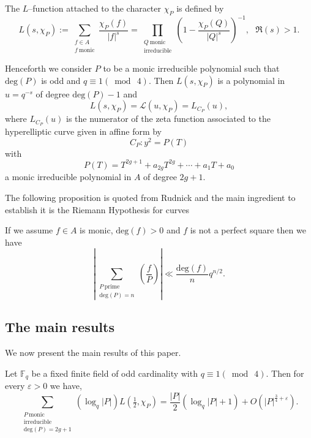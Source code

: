 \documentclass[11pt]{amsart}
\begin{document}
The $L$--function attached to the character $\chi_{P}$ is defined by
\begin{equation}
L(s,\chi_{P}):=\sum_{\substack{f\in A \\ f \ \mathrm{monic}}}\frac{\chi_{P}(f)}{|f|^{s}}=\prod_{\substack{Q \ \mathrm{monic} \\ \mathrm{irreducible}}}\left(1-\frac{\chi_{P}(Q)}{|Q|^{s}}\right)^{-1}, \ \ \ \mathfrak{R}(s)>1.
\end{equation}

Henceforth we consider $P$ to be a monic irreducible polynomial such that $\mathrm{deg}(P)$ is odd and $q\equiv1(\bmod \ 4)$. Then \cite[Propositions 4.3, 14.6 and 17.7]{Ro} $L(s,\chi_{P})$ is a polynomial in $u=q^{-s}$ of degree $\mathrm{deg}(P)-1$ and
\begin{equation}
L(s,\chi_{P})=\mathcal{L}(u,\chi_{P})=L_{C_{P}}(u),
\end{equation}
where $L_{C_{P}}(u)$ is the numerator of the zeta function associated to the hyperelliptic curve given in affine form by
\begin{equation}
C_{P}:y^{2}=P(T)
\end{equation}
with
\begin{equation}
P(T)=T^{2g+1}+a_{2g}T^{2g}+\cdots+a_{1}T+a_{0}
\end{equation}
a monic irreducible polynomial in $A$ of degree $2g+1$. 

The following proposition is quoted from Rudnick \cite{Ru} and the main ingredient to establish it is the Riemann Hypothesis for curves

\begin{prop}
\label{bound}
If we assume $f\in A$ is monic, $\mathrm{deg}(f)>0$ and $f$ is not a perfect square then we have
\begin{equation}
\left|\sum_{\substack{P \ \mathrm{prime} \\ \mathrm{deg}(P)=n}}\left(\frac{f}{P}\right)\right|\ll\frac{\mathrm{deg}(f)}{n}q^{n/2}.
\end{equation}
\end{prop}
\vspace{0.5cm}

\subsection{The main results}
We now present the main results of this paper.

\begin{thm}
\label{thm1}
Let $\mathbb{F}_{q}$ be a fixed finite field of odd cardinality with $q\equiv1(\bmod \ 4)$. Then for every $\varepsilon>0$ we have,
\begin{equation}
\sum_{\substack{P \ \mathrm{monic} \\ \mathrm{irreducible} \\ \mathrm{deg}(P)=2g+1}}(\log_{q}|P|)L(\tfrac{1}{2},\chi_{P})=\frac{|P|}{2}(\log_{q}|P|+1)+O(|P|^{\tfrac{3}{4}+\varepsilon}).
\end{equation}
\end{thm}
\end{document}
